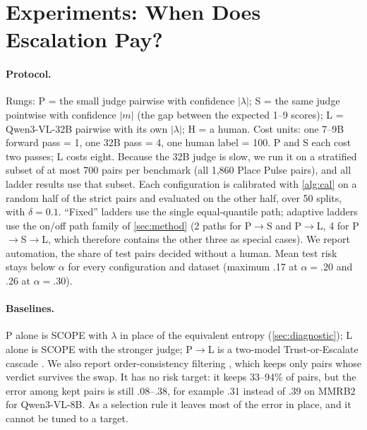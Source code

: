 \section{Experiments: When Does Escalation Pay?}\label{sec:experiments}

\paragraph{Protocol.}
Rungs: P = the small judge pairwise with confidence $|\lambda|$; S = the same judge pointwise with confidence $|m|$ (the gap between the expected 1--9 scores); L = Qwen3-VL-32B pairwise with its own $|\lambda|$; H = a human.
Cost units: one 7--9B forward pass = 1, one 32B pass = 4, one human label = 100. P and S each cost two passes; L costs eight.
Because the 32B judge is slow, we run it on a stratified subset of at most 700 pairs per benchmark (all 1{,}860 Place Pulse pairs), and all ladder results use that subset.
Each configuration is calibrated with \cref{alg:cal} on a random half of the strict pairs and evaluated on the other half, over 50 splits, with $\delta=0.1$.
``Fixed'' ladders use the single equal-quantile path; adaptive ladders use the on/off path family of \cref{sec:method} (2 paths for P$\to$S and P$\to$L, 4 for P$\to$S$\to$L, which therefore contains the other three as special cases).
We report automation, the share of test pairs decided without a human. Mean test risk stays below $\alpha$ for every configuration and dataset (maximum .17 at $\alpha=.20$ and .26 at $\alpha=.30$).

\paragraph{Baselines.}
P alone is SCOPE \citep{badshah2026scope} with $\lambda$ in place of the equivalent entropy (\cref{sec:diagnostic}); L alone is SCOPE with the stronger judge; P$\to$L is a two-model Trust-or-Escalate cascade \citep{jung2024trust}.
We also report order-consistency filtering \citep{seo2026when}, which keeps only pairs whose verdict survives the swap. It has no risk target: it keeps 33--94\% of pairs, but the error among kept pairs is still .08--.38, for example .31 instead of .39 on MMRB2 for Qwen3-VL-8B. As a selection rule it leaves most of the error in place, and it cannot be tuned to a target.

\begin{table}[t]
\centering\scriptsize
\setlength{\tabcolsep}{3pt}
\caption{Certified automation (\%) with Qwen3-VL-8B as the small judge (mean over 50 splits; ladder subset, $n$ = strict pairs). Bold: best per row and $\alpha$. P: pairwise; S: pointwise; L: Qwen3-VL-32B pairwise. P$\to$S (fixed) uses a single path; the others choose adaptively among rung subsets. Other small judges in \cref{app:ladders}.}\label{tab:ladder}

\end{table}


